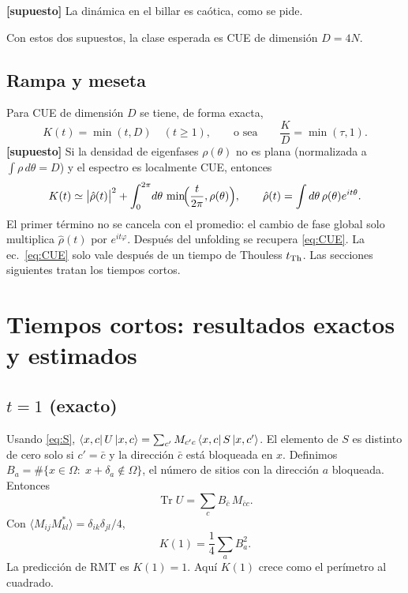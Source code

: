 \documentclass[aps, pra, onecolumn, longbibliography]{revtex4-2}
\newcommand{\Tr}{\operatorname{Tr}}
\begin{document}
\textbf{[supuesto]} La dinámica en el billar es caótica, como se pide.

Con estos dos supuestos, la clase esperada es CUE de dimensión $D=4N$.

\subsection{Rampa y meseta}
Para CUE de dimensión $D$ se tiene, de forma exacta,
\begin{equation}
    K(t)=\min(t,D)\quad(t\ge1),
    \qquad\text{o sea}\qquad
    \frac{K}{D}=\min(\tau,1).
    \label{eq:CUE}
\end{equation}
\textbf{[supuesto]} Si la densidad de eigenfases $\rho(\theta)$ no es plana
(normalizada a $\int\rho\,d\theta=D$) y el espectro es localmente CUE, entonces
\begin{equation}
    K(t)\simeq\bigl|\hat\rho(t)\bigr|^2
    +\int_0^{2\pi}\!d\theta\,\min\!\Bigl(\frac{t}{2\pi},\rho(\theta)\Bigr),
    \qquad \hat\rho(t)=\int d\theta\,\rho(\theta)e^{it\theta}.
    \label{eq:nonflat}
\end{equation}
El primer término no se cancela con el promedio: el cambio de fase global solo
multiplica $\hat\rho(t)$ por $e^{it\varphi}$. Después del unfolding se recupera
\eqref{eq:CUE}. La ec.~\eqref{eq:CUE} solo vale después de un tiempo de
Thouless $t_{\rm Th}$. Las secciones siguientes tratan los tiempos cortos.

\section{Tiempos cortos: resultados exactos y estimados}

\subsection{$t=1$ (exacto)}
Usando \eqref{eq:S},
$\bra{x,c}U\ket{x,c}=\sum_{c'}M_{c'c}\bra{x,c}S\ket{x,c'}$. El elemento de $S$
es distinto de cero solo si $c'=\bar c$ y la dirección $\bar c$ está bloqueada
en $x$. Definimos
$B_a=\#\{x\in\Omega:\;x+\delta_a\notin\Omega\}$, el número de sitios con la
dirección $a$ bloqueada. Entonces
\begin{equation}
    \Tr U=\sum_c B_{\bar c}\,M_{\bar c c}.
\end{equation}
Con $\langle M_{ij}M^*_{kl}\rangle=\delta_{ik}\delta_{jl}/4$,
\begin{equation}
    \boxed{K(1)=\frac14\sum_a B_a^2 .}
    \label{eq:K1}
\end{equation}
La predicción de RMT es $K(1)=1$. Aquí $K(1)$ crece como el perímetro al
cuadrado.
\end{document}
